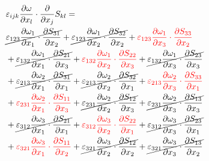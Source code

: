 \begin{equation}
	\begin{split}
		 & \varepsilon_{ijk}\pdv{\omega}{x_{l}} \cdot\pdv{}{x_{j}}S_{kl} =  \\ 
		&\cancel{\varepsilon_{123}\pdv{\omega_{1}}{x_{1}}\cdot\pdv{S_{31}}{x_{2}}}
		+\cancel{\varepsilon_{123}\pdv{\omega_{1}}{x_{2}}\cdot\pdv{S_{32}}{x_{2}}}
		+{\color{red}\varepsilon_{123}\pdv{\omega_{1}}{x_{3}}\cdot\pdv{S_{33}}{x_{2}}}
\\		&+\cancel{\varepsilon_{132}\pdv{\omega_{1}}{x_{1}}\cdot\pdv{S_{21}}{x_{3}}}
		+{\color{red}\varepsilon_{132}\pdv{\omega_{1}}{x_{2}}\cdot\pdv{S_{22}}{x_{3}}}
		+\cancel{\varepsilon_{132}\pdv{\omega_{1}}{x_{3}}\cdot\pdv{S_{23}}{x_{3}}}
\\		&+\cancel{\varepsilon_{213}\pdv{\omega_{2}}{x_{1}}\cdot\pdv{S_{31}}{x_{1}}}
		+\cancel{\varepsilon_{213}\pdv{\omega_{2}}{x_{2}}\cdot\pdv{S_{32}}{x_{1}}}
		+{\color{red}\varepsilon_{213}\pdv{\omega_{2}}{x_{3}}\cdot\pdv{S_{33}}{x_{1}}}
\\		&+{\color{red}\varepsilon_{231}\pdv{\omega_{2}}{x_{1}}\cdot\pdv{S_{11}}{x_{3}}}
		+\cancel{\varepsilon_{231}\pdv{\omega_{2}}{x_{2}}\cdot\pdv{S_{12}}{x_{3}}}
		+\cancel{\varepsilon_{231}\pdv{\omega_{2}}{x_{3}}\cdot\pdv{S_{13}}{x_{3}}}
\\		&+\cancel{\varepsilon_{312}\pdv{\omega_{3}}{x_{1}}\cdot\pdv{S_{21}}{x_{1}}}
		+{\color{red}\varepsilon_{312}\pdv{\omega_{3}}{x_{2}}\cdot\pdv{S_{22}}{x_{1}}}
		+\cancel{\varepsilon_{312}\pdv{\omega_{3}}{x_{3}}\cdot\pdv{S_{23}}{x_{1}}}
\\		&+{\color{red}\varepsilon_{321}\pdv{\omega_{3}}{x_{1}}\cdot\pdv{S_{11}}{x_{2}}}
		+\cancel{\varepsilon_{321}\pdv{\omega_{3}}{x_{2}}\cdot\pdv{S_{12}}{x_{2}}}
		+\cancel{\varepsilon_{321}\pdv{\omega_{3}}{x_{3}}\cdot\pdv{S_{13}}{x_{2}}}
\\	\end{split}
\end{equation}
